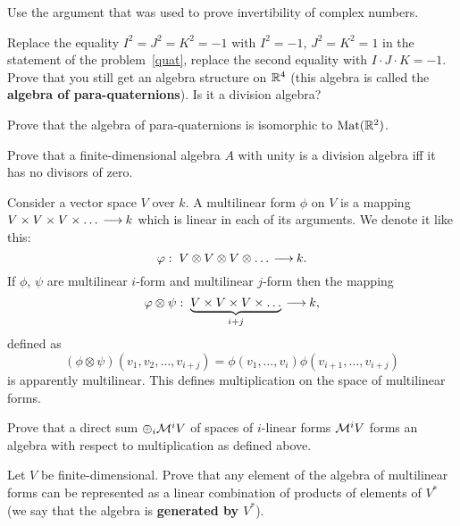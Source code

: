 \documentclass[12pt]{article}
\begin{document}
\begin{ukazanie}
Use the argument that was used to prove invertibility of complex
numbers. 
\end{ukazanie}

\begin{zadacha} 
  Replace the equality $I^2=J^2=K^2=-1$ with $I^2=-1$, $J^2=K^2=1$ in
  the statement of the problem~\ref{quat}, replace the second equality
  with $I \cdot J \cdot K=-1$. Prove that you still get an algebra
  structure on ${\mathbb R}^4$ (this algebra is called the {\bf algebra of
    para-quaternions}). Is it a division algebra?
\end{zadacha}

\begin{zadacha}[*]
Prove that the algebra of para-quaternions is isomorphic to $\operatorname{Mat}({\mathbb R}^2)$.
\end{zadacha}

\begin{zadacha}
Prove that a finite-dimensional algebra $A$ with unity is a division
algebra iff it has no divisors of zero.
\end{zadacha}


Consider a vector space $V$ over $k$. A multilinear form
$\phi$ on $V$ is a mapping $V\times V \times V \times \dots
{\:\longrightarrow\:} k$ which is linear in each of its arguments. We denote it like
this:
\[ 
\varphi:\; V\otimes V \otimes V \otimes \dots {\:\longrightarrow\:} k.
\]
If $\phi$, $\psi$ are multilinear $i$-form and multilinear $j$-form
then the mapping 
\[ 
\varphi\otimes \psi :\; \underbrace{V\times V \times V \times \dots}_{i+j}
   {\:\longrightarrow\:} k,
\]
defined as
\[ 
(\phi\otimes \psi)(v_1, v_2, \dots, v_{i+j}) = \phi( v_1, \dots, v_i) \phi(
   v_{i+1}, \dots, v_{i+j})
\]
is apparently multilinear. This defines multiplication on the space of
multilinear forms.

\begin{zadacha}
Prove that a direct sum $\oplus_i {\cal M}^i V$ of spaces of
$i$-linear forms ${\cal M}^i V$ forms an algebra with respect to
multiplication as defined above.
\end{zadacha}

\begin{zadacha}
  Let $V$ be finite-dimensional. Prove that any element of the algebra
  of multilinear forms can be represented as a linear combination of
  products of elements of $V^*$ (we say that the algebra is {\bf
    generated by $V^*$}).
\end{zadacha}
\end{document}
